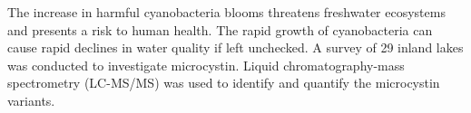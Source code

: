 

The increase in harmful cyanobacteria blooms threatens freshwater ecosystems and presents a risk to human health. The rapid growth of cyanobacteria can cause rapid declines in water quality if left unchecked. A survey of 29 inland lakes was conducted to investigate microcystin. Liquid chromatography-mass spectrometry (LC-MS/MS) was used to identify and quantify the microcystin variants.

